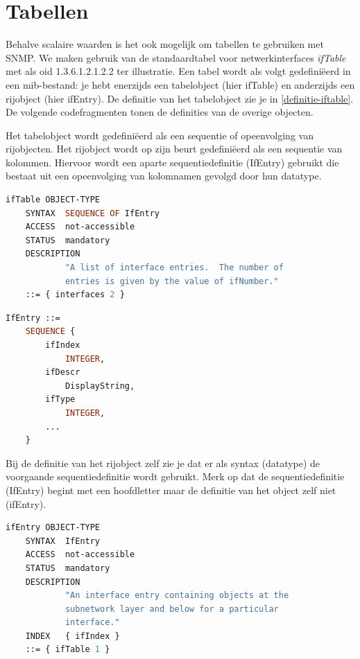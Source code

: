 \section{Tabellen}
\label{snmp-tabellen}

Behalve scalaire waarden is het ook mogelijk om tabellen te gebruiken met SNMP.
We maken gebruik van de standaardtabel voor netwerkinterfaces \emph{ifTable} met als \gls{oid} 1.3.6.1.2.1.2.2 ter illustratie.
Een tabel wordt als volgt gedefiniëerd in een \gls{mib}-bestand: 
je hebt enerzijds een tabelobject (hier ifTable) en anderzijds een rijobject (hier ifEntry).
De definitie van het tabelobject zie je in \cref{definitie-iftable}.
De volgende codefragmenten tonen de definities van de overige objecten. %

Het tabelobject wordt gedefiniëerd als een sequentie of opeenvolging van rijobjecten.
Het rijobject wordt op zijn beurt gedefiniëerd als een sequentie van kolommen.
Hiervoor wordt een aparte sequentiedefinitie (IfEntry) gebruikt die 
bestaat uit een opeenvolging van kolomnamen gevolgd door hun datatype.

\begin{lstlisting}[language=asn.1, float=h, caption={Definitie van ifTable}, label=definitie-iftable]
ifTable OBJECT-TYPE
	SYNTAX	SEQUENCE OF IfEntry
	ACCESS	not-accessible
	STATUS	mandatory
	DESCRIPTION
			"A list of interface entries.  The number of
			entries is given by the value of ifNumber."
	::= { interfaces 2 }
\end{lstlisting}

\begin{lstlisting}[language=asn.1, float=h, caption={Sequentiedefinitie voor een tabelrij}, label=definitie-sequentie-rij]
IfEntry ::=
	SEQUENCE {
		ifIndex
			INTEGER,
		ifDescr
			DisplayString,
		ifType
			INTEGER,
		...
	}
\end{lstlisting}

Bij de definitie van het rijobject zelf zie je dat er als syntax (datatype) de voorgaande sequentiedefinitie wordt gebruikt.
Merk op dat de sequentiedefinitie (IfEntry) begint met een hoofdletter maar de definitie van het object zelf niet (ifEntry).

\begin{lstlisting}[language=asn.1, float=h, caption={Definitie van een rijobject}, label=definitie-rijobject]
ifEntry OBJECT-TYPE
	SYNTAX	IfEntry
	ACCESS	not-accessible
	STATUS	mandatory
	DESCRIPTION
			"An interface entry containing objects at the
			subnetwork layer and below for a particular
			interface."
	INDEX	{ ifIndex }
	::= { ifTable 1 }
\end{lstlisting}

